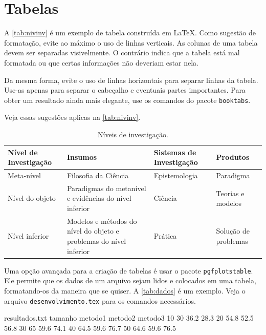 \section{Tabelas}

A \autoref{tab:nivinv} é um exemplo de tabela construída em \LaTeX.
  Como sugestão de formatação, evite ao máximo o uso de linhas verticais.
  As colunas de uma tabela devem ser separadas visivelmente.
  O contrário indica que a tabela está mal formatada ou que certas informações não deveriam estar nela.

Da mesma forma, evite o uso de linhas horizontais para separar linhas da tabela.
  Use-as apenas para separar o cabeçalho e eventuais partes importantes.
  Para obter um resultado ainda mais elegante, use os comandos do pacote \texttt{booktabs}.
  
Veja essas sugestões aplicas na \autoref{tab:nivinv}.

\begin{table}[!htb]
\footnotesize
\caption[Níveis de investigação]{Níveis de investigação.}
\label{tab:nivinv}
\begin{tabular}{m{2.6cm}m{6.0cm}m{2.25cm}m{3.40cm}}
  \toprule
  \textbf{Nível de Investigação} & \textbf{Insumos}  & \textbf{Sistemas de Investigação}  & \textbf{Produtos}  \\
  \midrule
  Meta-nível & Filosofia\index{filosofia} da Ciência  & Epistemologia & Paradigma  \\
  Nível do objeto & Paradigmas do metanível e evidências do nível inferior & Ciência  & Teorias e modelos \\
  Nível inferior & Modelos e métodos do nível do objeto e problemas do nível inferior & Prática & Solução de problemas  \\
  \bottomrule
\end{tabular}
\end{table}


Uma opção avançada para a criação de tabelas é usar o pacote \texttt{pgfplotstable}.
  Ele permite que os dados de um arquivo sejam lidos e colocados em uma tabela, formatando-os da maneira que se quiser.
  A \autoref{tab:dados} é um exemplo.
  Veja o arquivo \texttt{desenvolvimento.tex} para os comandos necessários.

\begin{filecontents*}{resultados.txt}
tamanho metodo1 metodo2 metodo3
10  30    36.2  28.3
20  54.8  52.5  56.8
30  65    59.6  74.1
40  64.5  59.6  76.7
50  64.6  59.6  76.5
\end{filecontents*}

